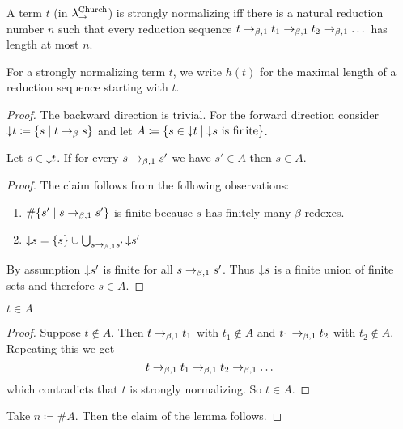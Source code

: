 \begin{boxlem}
    A term $t$ (in $\lambda_{\to}^{\text{Church}}$) is strongly normalizing iff there is a natural reduction number $n$ such that every reduction sequence $t \to_{\beta, 1} t_1 \to_{\beta, 1} t_2 \to_{\beta, 1} \dots$ has length at most $n$.
\end{boxlem}
For a strongly normalizing term $t$, we write $h(t)$ for the maximal length of a reduction sequence starting with $t$.
\begin{proof}
    The backward direction is trivial.
    For the forward direction consider ${\downarrow} t \coloneq \{s \mid t \to_{\beta} s\}$ and let $A \coloneq \{ s \in {\downarrow} t \mid {\downarrow} s \text{ is finite}\}$.
    \begin{claim}
        Let $s \in {\downarrow} t$.
        If for every $s \to_{\beta, 1} s'$ we have $s' \in A$ then $s \in A$.
        \begin{proof}
            The claim follows from the following observations:
            \begin{enumerate}
                \item $\#\{s' \mid s \to_{\beta, 1} s'\}$ is finite because $s$ has finitely many $\beta$-redexes.
                \item ${\downarrow} s = \{s\} \cup \bigcup_{s \to_{\beta, 1} s'} {\downarrow} s'$
            \end{enumerate}
            By assumption ${\downarrow} s'$ is finite for all $s \to_{\beta, 1} s'$.
            Thus ${\downarrow} s$ is a finite union of finite sets and therefore $s \in A$.
        \end{proof}
    \end{claim}
    \begin{claim}
        $t \in A$
        \begin{proof}
            Suppose $t \notin A$.
            Then $t \to_{\beta, 1} t_1$ with $t_1 \notin A$ and $t_1 \to_{\beta, 1} t_2$ with $t_2 \notin A$.
            Repeating this we get
            \begin{equation*}
                t \to_{\beta, 1} t_1 \to_{\beta, 1} t_2 \to_{\beta, 1} \dots
            \end{equation*}
            which contradicts that $t$ is strongly normalizing.
            So $t \in A$.
        \end{proof}
    \end{claim}
    Take $n \coloneq \# A$.
    Then the claim of the lemma follows.
\end{proof}